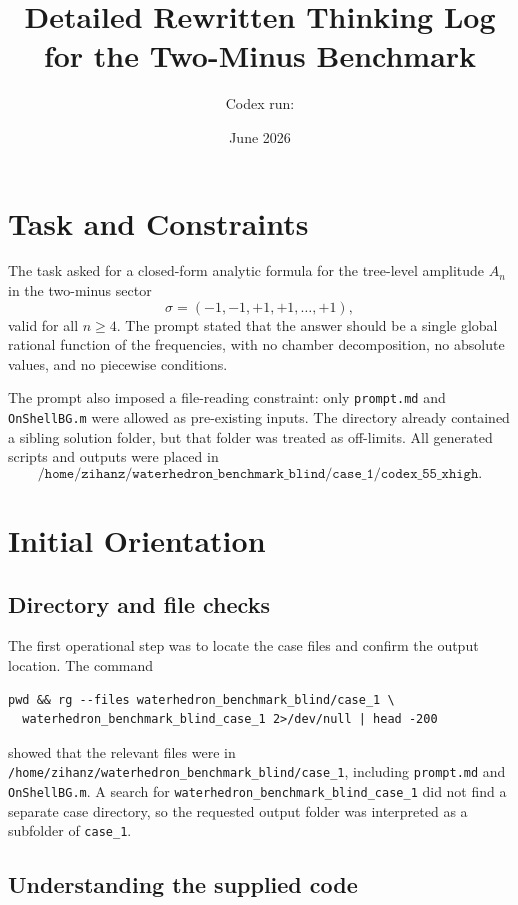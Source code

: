 \documentclass[11pt]{article}
\title{Detailed Rewritten Thinking Log for the Two-Minus Benchmark}
\author{Codex run: \code{codex\_55\_xhigh}}
\date{June 2026}
\newcommand{\code}[1]{\texttt{#1}}
\begin{document}
\maketitle


\section{Task and Constraints}

The task asked for a closed-form analytic formula for the tree-level
amplitude \(A_n\) in the two-minus sector
\[
  \sigma=(-1,-1,+1,+1,\ldots,+1),
\]
valid for all \(n\geq 4\).  The prompt stated that the answer should be a
single global rational function of the frequencies, with no chamber
decomposition, no absolute values, and no piecewise conditions.

The prompt also imposed a file-reading constraint: only \code{prompt.md} and
\code{OnShellBG.m} were allowed as pre-existing inputs.  The directory already
contained a sibling solution folder, but that folder was treated as off-limits.
All generated scripts and outputs were placed in
\[
\code{/home/zihanz/waterhedron\_benchmark\_blind/case\_1/codex\_55\_xhigh}.
\]

\section{Initial Orientation}

\subsection*{Directory and file checks}

The first operational step was to locate the case files and confirm the output
location.  The command

\begin{Verbatim}[fontsize=\small]
pwd && rg --files waterhedron_benchmark_blind/case_1 \
  waterhedron_benchmark_blind_case_1 2>/dev/null | head -200
\end{Verbatim}

showed that the relevant files were in
\code{/home/zihanz/waterhedron\_benchmark\_blind/case\_1}, including
\code{prompt.md} and \code{OnShellBG.m}.  A search for
\code{waterhedron\_benchmark\_blind\_case\_1} did not find a separate case
directory, so the requested output folder was interpreted as a subfolder of
\code{case\_1}.

\subsection*{Understanding the supplied code}
\end{document}
